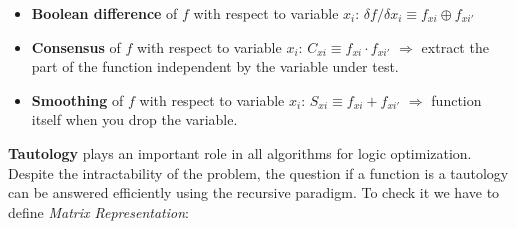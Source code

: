 \begin{itemize}
	\item \textbf{Boolean difference} of $f$ with respect to variable $x_{i}$: $\delta f/\delta x_{i} \equiv f_{xi} \oplus f_{xi'}$ 
	\item \textbf{Consensus} of $f$ with respect to variable $x_{i}$: $C_{xi} \equiv f_{xi} \cdot f_{xi'}$ $\Rightarrow$ extract the part of the function independent by the variable under test.
	\item \textbf{Smoothing} of $f$ with respect to variable $x_{i}$: $S_{xi} \equiv f_{xi} + f_{xi'}$ $\Rightarrow$ function itself when you drop the variable.
\end{itemize}

\textbf{Tautology} plays an important role in all algorithms for logic optimization. Despite the intractability of the problem, the question if a function is a tautology can be answered efficiently using the recursive paradigm. To check it we have to define \textit{Matrix Representation}:

